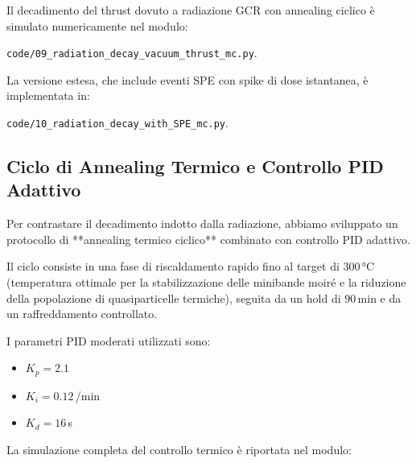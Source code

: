 \documentclass[11pt,a4paper]{article}
\theoremstyle{plain}
\theoremstyle{definition}
\begin{document}
Il decadimento del thrust dovuto a radiazione GCR con annealing ciclico è simulato numericamente nel modulo:

\vspace{0.2cm}

\texttt{code/09\_radiation\_decay\_vacuum\_thrust\_mc.py}. 

\vspace{0.2cm}

La versione estesa, che include eventi SPE con spike di dose istantanea, è implementata in:

\vspace{0.2cm}

\texttt{code/10\_radiation\_decay\_with\_SPE\_mc.py}.



\vspace{0.7cm}



\subsection{Ciclo di Annealing Termico e Controllo PID Adattivo}


\vspace{0.2cm}

Per contrastare il decadimento indotto dalla radiazione, abbiamo sviluppato un protocollo di **annealing termico ciclico** combinato con controllo PID adattivo. 


\vspace{0.3cm}


Il ciclo consiste in una fase di riscaldamento rapido fino al target di $300$\,°C (temperatura ottimale per la stabilizzazione delle minibande moiré e la riduzione della popolazione di quasiparticelle termiche), seguita da un hold di $90$\,min e da un raffreddamento controllato.

\vspace{0.5cm}

I parametri PID moderati utilizzati sono:
\begin{itemize}
    \item $K_p = 2.1$
    \item $K_i = 0.12$\,/min
    \item $K_d = 16$\,s
\end{itemize}


\vspace{0.3cm}

La simulazione completa del controllo termico è riportata nel modulo:
\end{document}

